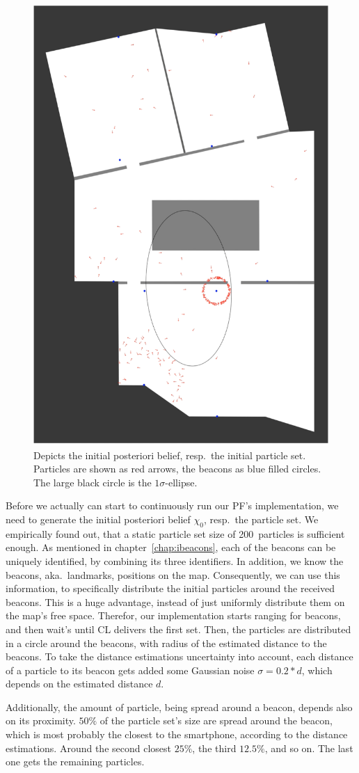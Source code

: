 \begin{figure}
\includegraphics[height=0.7\textwidth]{figures/algo_particle_generation}
\caption{Depicts the initial posteriori belief, resp.\ the initial particle set. Particles are shown as red arrows, the beacons as blue filled circles. The large black circle is the $1\sigma$-ellipse.}
\label{fig:pf_initialDist}
\end{figure}

Before we actually can start to continuously run our \acs{PF}'s implementation, we need to generate the initial posteriori belief $\chi_0$, resp.\ the particle set. We empirically found out, that a static particle set size of 200~particles is sufficient enough. As mentioned in chapter~\ref{chap:ibeacons}, each of the beacons can be uniquely identified, by combining its three identifiers. In addition, we know the beacons, aka.\ landmarks, positions on the map. Consequently, we can use this information, to specifically distribute the initial particles around the received beacons. This is a huge advantage, instead of just uniformly distribute them on the map's free space. Therefor, our implementation starts ranging for beacons, and then wait's until \ac{CL} delivers the first set. Then, the particles are distributed in a circle around the beacons, with radius of the estimated distance to the beacons. To take the distance estimations uncertainty into account, each distance of a particle to its beacon gets added some Gaussian noise $\sigma = 0.2 * d$, which depends on the estimated distance $d$. 

Additionally, the amount of particle, being spread around a beacon, depends also on its proximity. $50\%$ of the particle set's size are spread around the beacon, which is most probably the closest to the smartphone, according to the distance estimations. Around the second closest $25\%$, the third $12.5\%$, and so on. The last one gets the remaining particles.

